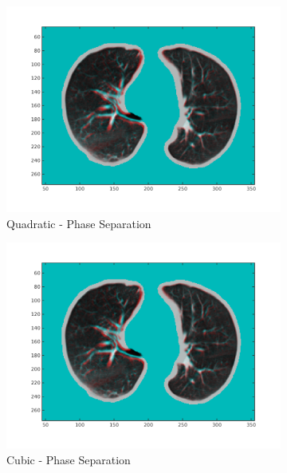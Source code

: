 \documentclass[11pt,a4paper,oneside]{report}
\begin{document}
\begin{figure}[H]
\begin{subfigure}[b]{0.33\textwidth}
    \includegraphics[width=\textwidth, trim=0 50 0 0,clip=true]{figures/task4/visAss_m5.png}
    \caption{Quadratic - Phase Separation}
  \end{subfigure}
  \begin{subfigure}[b]{0.33\textwidth}
    \includegraphics[width=\textwidth, trim=0 50 0 0,clip=true]{figures/task4/visAss_m6.png}
    \caption{Cubic - Phase Separation}
  \end{subfigure}
  ~
  \hspace*{-2em}
  \begin{subfigure}[b]{0.33\textwidth}

\end{subfigure}
\end{figure}
\end{document}
